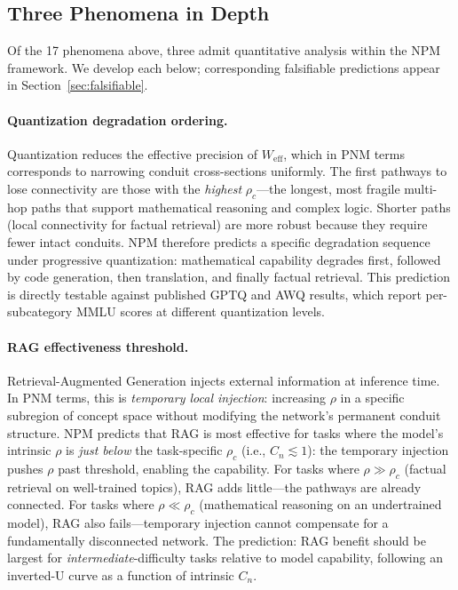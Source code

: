 \documentclass[11pt,a4paper]{article}
\newcommand{\Weff}{W_{\text{eff}}}
\begin{document}
\subsection{Three Phenomena in Depth}

Of the 17 phenomena above, three admit quantitative analysis within the NPM framework.
We develop each below; corresponding falsifiable predictions appear in
Section~\ref{sec:falsifiable}.

\paragraph{Quantization degradation ordering.}
Quantization reduces the effective precision of $\Weff$, which in PNM terms
corresponds to narrowing conduit cross-sections uniformly.
The first pathways to lose connectivity are those with the \emph{highest}
$\rho_c$---the longest, most fragile multi-hop paths that support
mathematical reasoning and complex logic.
Shorter paths (local connectivity for factual retrieval) are more robust
because they require fewer intact conduits.
NPM therefore predicts a specific degradation sequence under progressive
quantization: mathematical capability degrades first, followed by code generation,
then translation, and finally factual retrieval.
This prediction is directly testable against published GPTQ and AWQ results,
which report per-subcategory MMLU scores at different quantization levels.

\paragraph{RAG effectiveness threshold.}
Retrieval-Augmented Generation injects external information at inference time.
In PNM terms, this is \emph{temporary local injection}: increasing $\rho$ in a
specific subregion of concept space without modifying the network's
permanent conduit structure.
NPM predicts that RAG is most effective for tasks where the model's intrinsic
$\rho$ is \emph{just below} the task-specific $\rho_c$ (i.e., $C_n \lesssim 1$):
the temporary injection pushes $\rho$ past threshold, enabling the capability.
For tasks where $\rho \gg \rho_c$ (factual retrieval on well-trained topics),
RAG adds little---the pathways are already connected.
For tasks where $\rho \ll \rho_c$ (mathematical reasoning on an undertrained model),
RAG also fails---temporary injection cannot compensate for a fundamentally
disconnected network.
The prediction: RAG benefit should be largest for \emph{intermediate}-difficulty tasks
relative to model capability, following an inverted-U curve as a function of
intrinsic $C_n$.
\end{document}
